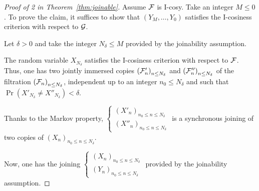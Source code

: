 \documentclass[12pt,a4paper]{article}
\begin{document}
\begin{proof}[Proof of 2 in Theorem~\ref{thm:joinable}]

Assume $\mathcal{F}$ is I-cosy. Take an integer $M \leq 0$. 
To prove the claim, it suffices to show that $(Y_M, \ldots, Y_0)$ 
satisfies the I-cosiness criterion with respect to $\mathcal{G}$. 

Let $\delta>0$ and take the integer $N_\delta \leq M$ provided by the 
joinability assumption. 

The random variable $X_{N_\delta}$ satisfies the I-cosiness criterion 
with respect to $\mathcal{F}$. Thus, one has two jointly immersed copies 
${(\mathcal{F}'_n)}_{n \leq N_\delta}$ and ${(\mathcal{F}''_n)}_{n \leq N_\delta}$ 
of the filtration ${(\mathcal{F}_n)}_{n \leq N_\delta}$, independent up to 
an integer $n_0 \leq N_\delta$ and  
 such that $\Pr(X'_{N_\delta} \neq X''_{N_\delta}) < \delta$. 



Thanks to the Markov property,  
$\left\{\begin{smallmatrix} {(X'_n)}_{n_0 \leq n \leq N_\delta} \\ 
{(X''_n)}_{n_0 \leq n \leq N_\delta}
\end{smallmatrix}\right.$ 
is a synchronous joining 
of two copies of ${(X_n)}_{n_0 \leq n \leq N_\delta}$. 

Now, one has the joining 
 $\left\{\begin{smallmatrix} {(X_n)}_{n_0 \leq n \leq N_\delta} \\ 
{(Y_n)}_{n_0 \leq n \leq N_\delta}
\end{smallmatrix}\right.$ provided by the joinability assumption. 



\end{proof}
\end{document}
